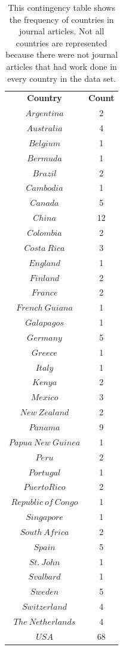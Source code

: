 \documentclass[12pt, letterpaper]{article}
\begin{document}
\begin{table}[!h]
\begin{center}
\begin{tabular}{|c|c|}
\textbf{Country} & \textbf{Count}\\ 
$Argentina$ & 2\\
$Australia$ & 4\\
$Belgium$ & 1\\
$Bermuda$ & 1\\
$Brazil$ & 2\\
$Cambodia$ & 1\\
$Canada$ & 5\\
$China$ & 12\\
$Colombia$ & 2\\
$Costa\ Rica$ & 3\\
$England$ & 1\\
$Finland$ & 2\\
$France$ & 2\\
$French\ Guiana$ & 1\\
$Galapagos$ & 1\\
$Germany$ &  5\\
$Greece$ &  1\\
$Italy$ & 1\\
$Kenya$ & 2\\
$Mexico$ & 3\\
$New\ Zealand$ & 2\\
$Panama$ & 9\\
$Papua\ New\ Guinea$ &  1\\
$Peru$ &  2\\
$Portugal$ & 1\\
$Puerto Rico$ & 2\\
$Republic\ of\ Congo$ & 1\\
$Singapore$ & 1\\
$South\ Africa$ & 2\\
$Spain$ &  5\\
$St.\ John$ &  1\\
$Svalbard$ & 1\\
$Sweden$ & 5\\
$Switzerland$ & 4\\
$The\ Netherlands$ & 4\\
$USA$ & 68\\
\end{tabular}
\end{center}
\caption{This contingency table shows the frequency of countries in journal articles. Not all countries are represented because there were not journal articles that had work done in every country in the data set.}
\label{fig: Contingency Table for Country}
\end{table}
\end{document}
